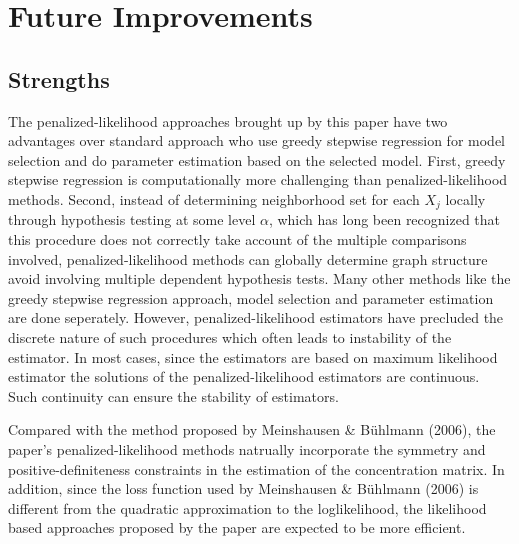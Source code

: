 
\section*{Future Improvements}

\subsection*{Strengths}
The penalized-likelihood approaches brought up by this paper have two advantages over standard approach who use greedy stepwise regression for model selection and do parameter estimation based on the selected model.  First, greedy stepwise regression is computationally more challenging than penalized-likelihood methods.  Second, instead of determining neighborhood set for each $X_j$ locally through hypothesis testing at some level $\alpha$, which has long been recognized that this procedure does not correctly take account of the multiple comparisons involved, penalized-likelihood methods can globally determine graph structure avoid involving multiple dependent hypothesis tests.  Many other methods like the greedy stepwise regression approach, model selection and parameter estimation are done seperately.  However, penalized-likelihood estimators have precluded the discrete nature of such procedures which often leads to instability of the estimator.  In most cases, since the estimators are based on maximum likelihood estimator the solutions of the penalized-likelihood estimators are continuous.  Such continuity can ensure the stability of estimators.  

Compared with the method proposed by Meinshausen \& Bühlmann (2006), the paper's penalized-likelihood methods natrually incorporate the symmetry and positive-definiteness constraints in the estimation of the concentration matrix.  In addition, since the loss function used by Meinshausen \& Bühlmann (2006) is different from the quadratic approximation to the loglikelihood, the likelihood based approaches proposed by the paper are expected to be more efficient.
  



